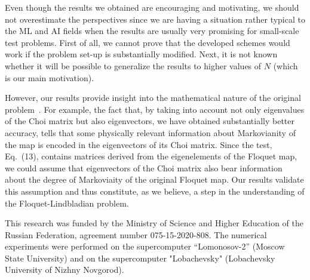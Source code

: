 \documentclass[%
 aip,
 floatfix,
 amsmath,amssymb,
 reprint,%
]{revtex4-1}
\begin{document}
Even though the results we obtained are encouraging and motivating, we should not overestimate the perspectives since we are having a situation rather typical to the ML and AI fields when the results are usually very promising for small-scale test problems. First of all, we cannot prove that the developed schemes would work if the problem set-up is substantially modified. Next, it is not known whether it will be possible to generalize the results to higher values of $N$ (which is our main motivation). 

However, our results provide insight
into the mathematical nature of the original problem~\cite{math}. For example, the fact that, by taking into account not only eigenvalues of the Choi matrix but also eigenvectors, we have obtained substantially better accuracy, tells that some physically relevant information about Markovianity of the map is encoded in the eigenvectors of its Choi matrix.  Since  the test, Eq.~(13), contains matrices derived from the eigenelements of the Floquet map, we could assume that eigenvectors of the Choi matrix also bear information about the degree of Markoviaity of the original Floquet map. Our results validate this assumption and thus constitute, as we believe, a step in the understanding of the Floquet-Lindbladian problem.



\begin{acknowledgments}
This research was funded by the Ministry of Science and Higher Education of the Russian Federation, agreement number 075-15-2020-808.
The numerical experiments
were  performed on the supercomputer “Lomonosov-2” (Moscow State University) and on the supercomputer "Lobachevsky" (Lobachevsky University of Nizhny Novgorod).
\end{acknowledgments}
\end{document}
